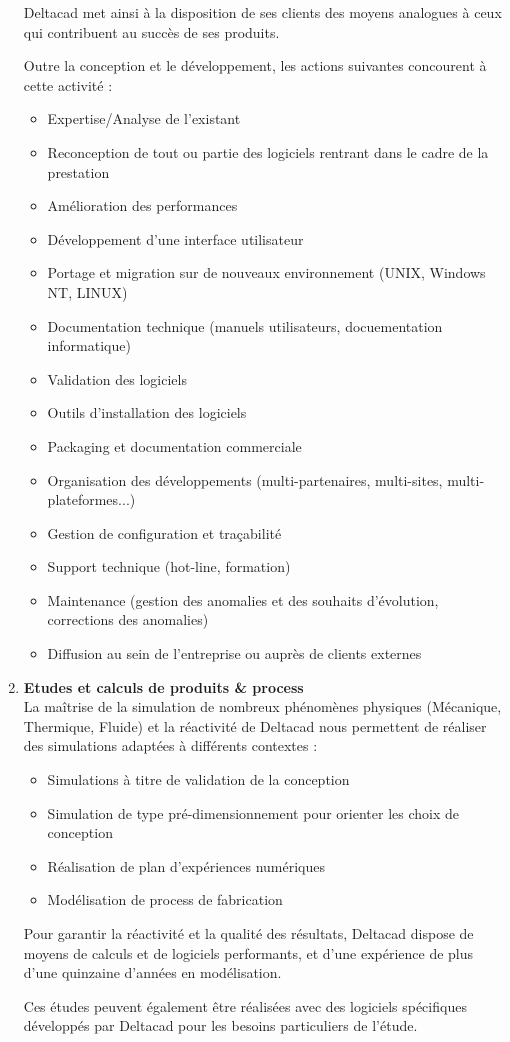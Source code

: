 \begin{enumerate}
Deltacad met ainsi à la disposition de ses clients des moyens analogues à ceux qui contribuent au succès de ses produits.

Outre la conception et le développement, les actions suivantes concourent à cette activité :
\begin{itemize}
\item Expertise/Analyse de l'existant
\item Reconception de tout ou partie des logiciels rentrant dans le cadre de la prestation
\item Amélioration des performances
\item Développement d'une interface utilisateur
\item Portage et migration sur de nouveaux environnement (UNIX, Windows NT, LINUX)
\item Documentation technique (manuels utilisateurs, docuementation informatique)
\item Validation des logiciels
\item Outils d'installation des logiciels
\item Packaging et documentation commerciale
\item Organisation des développements (multi-partenaires, multi-sites, multi-plateformes...)
\item Gestion de configuration et traçabilité
\item Support technique (hot-line, formation)
\item Maintenance (gestion des anomalies et des souhaits d'évolution, corrections des anomalies)
\item Diffusion au sein de l'entreprise ou auprès de clients externes
\end{itemize}
\item \textbf{Etudes et calculs de produits \& process}\\
La maîtrise de la simulation de nombreux phénomènes physiques (Mécanique, Thermique, Fluide) et la réactivité de Deltacad nous permettent de réaliser des simulations adaptées à différents contextes :
\begin{itemize}
\item Simulations à titre de validation de la conception
\item Simulation de type pré-dimensionnement pour orienter les choix de conception
\item Réalisation de plan d'expériences numériques
\item Modélisation de process de fabrication
\end{itemize}
Pour garantir la réactivité et la qualité des résultats, Deltacad dispose de moyens de calculs et de logiciels performants, et d'une expérience de plus d'une quinzaine d'années en modélisation.

Ces études peuvent également être réalisées avec des logiciels spécifiques développés par Deltacad pour les besoins particuliers de l'étude.
\end{enumerate}


